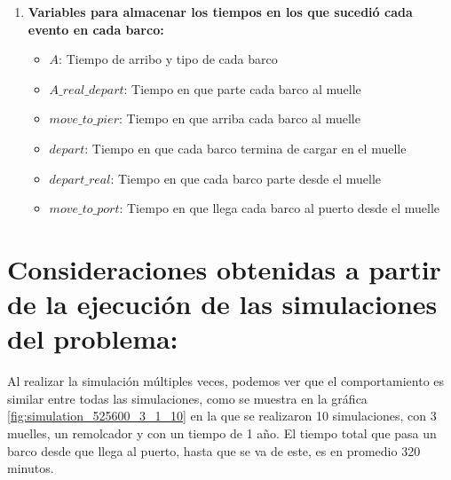 \documentclass[titlepage,11pt]{scrartcl}
\begin{document}
\begin{enumerate}
\begin{itemize}
			\end{itemize}
		\item \textbf{Variables para almacenar los tiempos en los que sucedió cada evento en cada barco:}
			\begin{itemize}
				\item $A$: Tiempo de arribo y tipo de cada barco
    			\item $A\_real\_depart$: Tiempo en que parte cada barco al muelle
    			\item $move\_to\_pier$: Tiempo en que arriba cada barco al muelle
    			\item $depart$: Tiempo en que cada barco termina de cargar en el muelle
    			\item $depart\_real$: Tiempo en que cada barco parte desde el muelle
    			\item $move\_to\_port$: Tiempo en que llega cada barco al puerto desde el muelle
			\end{itemize}
	\end{enumerate}


\section{Consideraciones obtenidas a partir de la ejecución de las simulaciones del
problema:}

	Al realizar la simulación múltiples veces, podemos ver que el comportamiento es similar entre todas las simulaciones, como se muestra en la gráfica \ref{fig:simulation_525600_3_1_10} en la que se realizaron 10 simulaciones, con 3 muelles, un remolcador y con un tiempo de 1 año. El tiempo total que pasa un barco desde que llega al puerto, hasta que se va de este, es en promedio 320 minutos.
	
\end{document}
